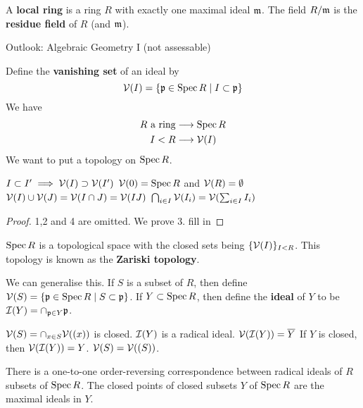 \begin{defn}[0.20]
	A \textbf{local ring} is a ring $R$ with exactly one maximal ideal $\mathfrak{m}$.
	The field $R/\mathfrak{m}$ is the \textbf{residue field} of $R$ (and $\mathfrak{m}$).
\end{defn}

Outlook: Algebraic Geometry I (not assessable)

Define the \textbf{vanishing set} of an ideal by
\[\mathcal{V}(I) = \{\mathfrak{p} \in \operatorname{Spec} R \mid I \subset \mathfrak{p}\}\]
We have
\begin{align*}
	R \text{ a ring} &\longrightarrow \operatorname{Spec} R \\
	I<R &\longrightarrow \mathcal{V}(I)
\end{align*}
We want to put a topology on $\operatorname{Spec} R$.

\begin{prop}[AG.1]
  	\leavevmode
	\begin{enum}
		\io $I \subset I' \implies \mathcal{V}(I) \supset \mathcal{V}(I')$
		\io $\mathcal{V}(0) = \operatorname{Spec} R$ and $\mathcal{V}(R) = \emptyset$
		\io $\mathcal{V}(I) \cup \mathcal{V}(J) = \mathcal{V}(I \cap J) = \mathcal{V}(IJ)$
		\io $\bigcap_{i \in I} \mathcal{V}(I_i) = \mathcal{V}(\sum_{i \in I} I_i)$
	\end{enum}
\end{prop}

\begin{proof}
	1,2 and 4 are omitted.
	We prove 3.
	fill in
\end{proof}

\begin{thm}[AG.2]
	$\operatorname{Spec} R$ is a topological space with the closed sets being $\{\mathcal{V}(I)\}_{I<R}$.
	This topology is known as the \textbf{Zariski topology}.
\end{thm}

We can generalise this.
If $S$ is a subset of $R$, then define $\mathcal{V}(S) = \{\mathfrak{p} \in \operatorname{Spec} R \mid S \subset \mathfrak{p}\}$.
If $Y \subset \operatorname{Spec} R$, then define the \textbf{ideal} of $Y$ to be $\mathcal{I}(Y) = \cap_{\mathfrak{p} \in Y} \mathfrak{p}$.

\begin{rmk}
  	\leavevmode
	\begin{enum}
		\io $\mathcal{V}(S) = \cap_{x \in S} \mathcal{V}((x))$ is closed.
		\io $\mathcal{I}(Y)$ is a radical ideal.
		\io $\mathcal{V}(\mathcal{I}(Y)) = \overline{Y}$
		\io If $Y$ is closed, then $\mathcal{V}(\mathcal{I}(Y))=Y$.
		\io $\mathcal{V}(S) = \mathcal{V}((S))$.
	\end{enum}
\end{rmk}

\begin{prop}[AG.3]
  	\leavevmode
	\begin{enum}
		\io There is a one-to-one order-reversing correspondence between radical ideals of $R$ subsets of $\operatorname{Spec} R$.
		\io The closed points of closed subsets $Y$ of $\operatorname{Spec} R$ are the maximal ideals in $Y$.
	\end{enum}
\end{prop}

